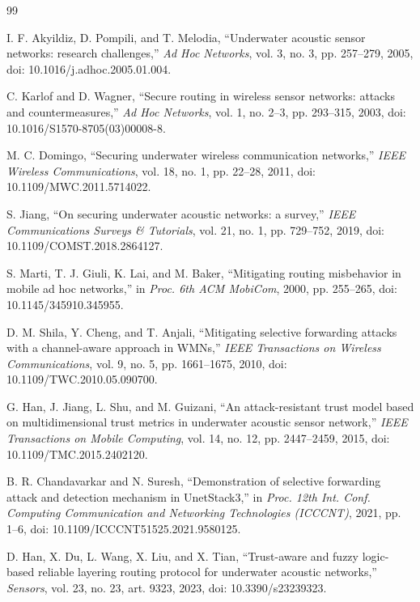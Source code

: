 \documentclass{article}
\begin{document}
\begin{thebibliography}{99}

I. F. Akyildiz, D. Pompili, and T. Melodia,
``Underwater acoustic sensor networks: research challenges,''
\emph{Ad Hoc Networks}, vol. 3, no. 3, pp. 257--279, 2005,
doi: 10.1016/j.adhoc.2005.01.004.

C. Karlof and D. Wagner,
``Secure routing in wireless sensor networks: attacks and countermeasures,''
\emph{Ad Hoc Networks}, vol. 1, no. 2--3, pp. 293--315, 2003,
doi: 10.1016/S1570-8705(03)00008-8.

M. C. Domingo,
``Securing underwater wireless communication networks,''
\emph{IEEE Wireless Communications}, vol. 18, no. 1, pp. 22--28, 2011,
doi: 10.1109/MWC.2011.5714022.

S. Jiang,
``On securing underwater acoustic networks: a survey,''
\emph{IEEE Communications Surveys \& Tutorials}, vol. 21, no. 1, pp. 729--752, 2019,
doi: 10.1109/COMST.2018.2864127.

S. Marti, T. J. Giuli, K. Lai, and M. Baker,
``Mitigating routing misbehavior in mobile ad hoc networks,''
in \emph{Proc. 6th ACM MobiCom}, 2000, pp. 255--265,
doi: 10.1145/345910.345955.

D. M. Shila, Y. Cheng, and T. Anjali,
``Mitigating selective forwarding attacks with a channel-aware approach in WMNs,''
\emph{IEEE Transactions on Wireless Communications}, vol. 9, no. 5, pp. 1661--1675, 2010,
doi: 10.1109/TWC.2010.05.090700.

G. Han, J. Jiang, L. Shu, and M. Guizani,
``An attack-resistant trust model based on multidimensional trust metrics in underwater acoustic sensor network,''
\emph{IEEE Transactions on Mobile Computing}, vol. 14, no. 12, pp. 2447--2459, 2015,
doi: 10.1109/TMC.2015.2402120.

B. R. Chandavarkar and N. Suresh,
``Demonstration of selective forwarding attack and detection mechanism in UnetStack3,''
in \emph{Proc. 12th Int. Conf. Computing Communication and Networking Technologies (ICCCNT)}, 2021, pp. 1--6,
doi: 10.1109/ICCCNT51525.2021.9580125.

D. Han, X. Du, L. Wang, X. Liu, and X. Tian,
``Trust-aware and fuzzy logic-based reliable layering routing protocol for underwater acoustic networks,''
\emph{Sensors}, vol. 23, no. 23, art. 9323, 2023,
doi: 10.3390/s23239323.


\end{thebibliography}
\end{document}
